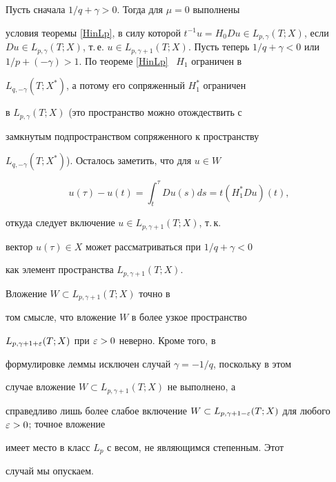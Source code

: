 \begin{pf}


Пусть сначала $1/q+\gamma >0$. Тогда для $\mu=0$ выполнены


условия теоремы \ref{HinLp}, в силу которой $t^{-1}u = H_0 D u \in


L_{p,\gamma}(T;X)$, если $D u \in L_{p,\gamma}(T;X)$, т.\,е. $u


\in L_{p,\gamma+1}(T;X)$. Пусть теперь $1/q+\gamma < 0$ или $1/p


+(-\gamma) > 1$. По теореме \ref{HinLp} \ $H_1$ ограничен в


$L_{q,-\gamma}(T;X^*)$, а потому его сопряженный $H_1^*$ ограничен


в $L_{p,\gamma}(T;X)$ (это пространство можно отождествить с


замкнутым подпространством сопряженного к пространству


$L_{q,-\gamma}(T;X^*)$). Осталось заметить, что для $u \in W$


$$


u(\tau)-u(t)= \int_t^\tau D u(s) d s= t(H_1^* D u)(t),


$$


откуда следует включение $u \in L_{p,\gamma+1}(T;X)$, т.\,к.


вектор $u(\tau) \in X$ может рассматриваться при $1/q+\gamma < 0$


как элемент пространства $L_{p,\gamma+1}(T;X)$.


\end{pf}





\begin{notenonum}


Вложение $W \subset L_{p,\gamma+1}(T;X)$ точно в


том смысле, что вложение $W$ в более узкое пространство


$L_{p,\gamma+1+{\varepsilon}}(T;X)$ при ${\varepsilon}>0$ неверно. Кроме того, в


формулировке леммы исключен случай $\gamma=-1/q$, поскольку в этом


случае вложение $W \subset L_{p,\gamma+1}(T;X)$ не выполнено, а


справедливо лишь более слабое включение $W \subset


L_{p,\gamma+1-\eps}(T;X)$ для любого $\eps>0$; точное вложение


имеет место в класс $L_p$ с весом, не являющимся степенным. Этот


случай мы опускаем.


\end{notenonum}





